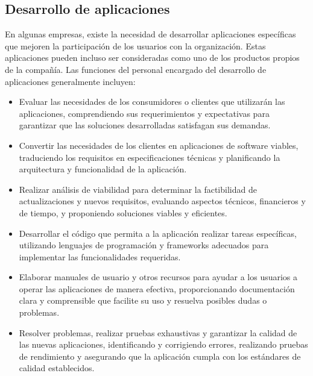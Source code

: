\documentclass{article}
\begin{document}
\subsection{Desarrollo de aplicaciones}
En algunas empresas, existe la necesidad de desarrollar aplicaciones específicas que mejoren la participación de los usuarios con la organización. Estas aplicaciones pueden incluso ser consideradas como uno de los productos propios de la compañía.
Las funciones del personal encargado del desarrollo de aplicaciones generalmente incluyen:
\begin{itemize}[label=$\circ$]
    \item Evaluar las necesidades de los consumidores o clientes que utilizarán las aplicaciones, comprendiendo sus requerimientos y expectativas para garantizar que las soluciones desarrolladas satisfagan sus demandas.
    \item Convertir las necesidades de los clientes en aplicaciones de software viables, traduciendo los requisitos en especificaciones técnicas y planificando la arquitectura y funcionalidad de la aplicación.
    \item Realizar análisis de viabilidad para determinar la factibilidad de actualizaciones y nuevos requisitos, evaluando aspectos técnicos, financieros y de tiempo, y proponiendo soluciones viables y eficientes.
    \item Desarrollar el código que permita a la aplicación realizar tareas específicas, utilizando lenguajes de programación y frameworks adecuados para implementar las funcionalidades requeridas.
    \item Elaborar manuales de usuario y otros recursos para ayudar a los usuarios a operar las aplicaciones de manera efectiva, proporcionando documentación clara y comprensible que facilite su uso y resuelva posibles dudas o problemas.
    \item Resolver problemas, realizar pruebas exhaustivas y garantizar la calidad de las nuevas aplicaciones, identificando y corrigiendo errores, realizando pruebas de rendimiento y asegurando que la aplicación cumpla con los estándares de calidad establecidos.
\end{itemize}
\end{document}
